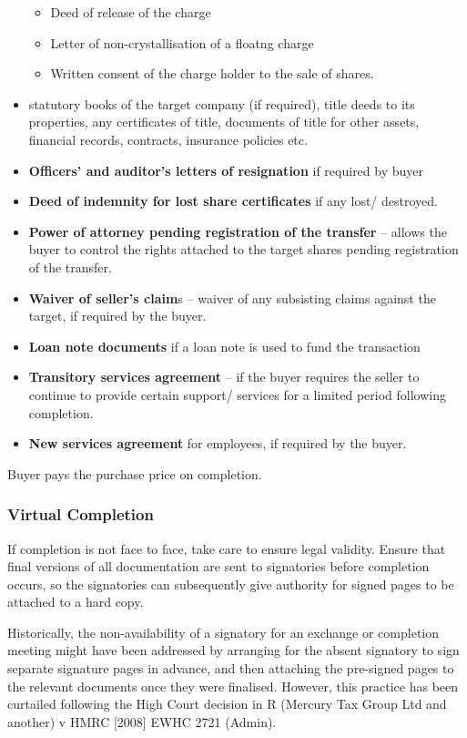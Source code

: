 \documentclass[
]{article}
\providecommand{\tightlist}{%
  \setlength{\itemsep}{0pt}\setlength{\parskip}{0pt}}
\begin{document}
\begin{itemize}
  \begin{itemize}
  \tightlist
  \item
    Deed of release of the charge
  \item
    Letter of non-crystallisation of a floatng charge
  \item
    Written consent of the charge holder to the sale of shares.
  \end{itemize}
\item
  statutory books of the target company (if required), title deeds to
  its properties, any certificates of title, documents of title for
  other assets, financial records, contracts, insurance policies etc.
\item
  \textbf{Officers' and auditor's letters of resignation} if required by
  buyer
\item
  \textbf{Deed of indemnity for lost share certificates} if any lost/
  destroyed.
\item
  \textbf{Power of attorney pending registration of the transfer} --
  allows the buyer to control the rights attached to the target shares
  pending registration of the transfer.
\item
  \textbf{Waiver of seller's claim}s -- waiver of any subsisting claims
  against the target, if required by the buyer.
\item
  \textbf{Loan note documents} if a loan note is used to fund the
  transaction
\item
  \textbf{Transitory services agreement} -- if the buyer requires the
  seller to continue to provide certain support/ services for a limited
  period following completion.
\item
  \textbf{New services agreement} for employees, if required by the
  buyer.
\end{itemize}

Buyer pays the purchase price on completion.

\hypertarget{virtual-completion}{%
\subsubsection{Virtual Completion}\label{virtual-completion}}

If completion is not face to face, take care to ensure legal validity.
Ensure that final versions of all documentation are sent to signatories
before completion occurs, so the signatories can subsequently give
authority for signed pages to be attached to a hard copy.

Historically, the non-availability of a signatory for an exchange or
completion meeting might have been addressed by arranging for the absent
signatory to sign separate signature pages in advance, and then
attaching the pre-signed pages to the relevant documents once they were
finalised. However, this practice has been curtailed following the High
Court decision in R (Mercury Tax Group Ltd and another) v HMRC
{[}2008{]} EWHC 2721 (Admin).
\end{document}
